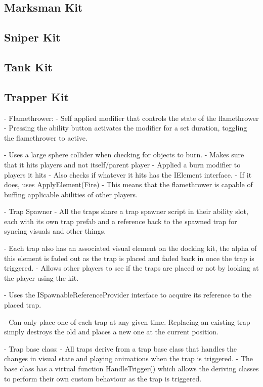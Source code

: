 \subsection{Marksman Kit}
\subsection{Sniper Kit}
\subsection{Tank Kit}

\subsection{Trapper Kit}
- Flamethrower:
    - Self applied modifier that controls the state of the flamethrower
    - Pressing the ability button activates the modifier for a set duration, toggling the flamethrower to active.
    
    - Uses a large sphere collider when checking for objects to burn.
            - Makes sure that it hits players and not itself/parent player
            - Applied a burn modifier to players it hits
            - Also checks if whatever it hits has the IElement interface.
                - If it does, uses ApplyElement(Fire)
            - This means that the flamethrower is capable of buffing applicable abilities of other players. 

- Trap Spawner
    - All the traps share a trap spawner script in their ability slot, each with its own trap prefab and a reference back to the spawned trap for syncing visuals and other things. 
    
    - Each trap also has an associated visual element on the docking kit, the alpha of this element is faded out as the trap is placed and faded back in once the trap is triggered. 
        - Allows other players to see if the traps are placed or not by looking at the player using the kit.
        
    - Uses the ISpawnableReferenceProvider interface to acquire its reference to the placed trap. 
    
    - Can only place one of each trap at any given time. Replacing an existing trap simply destroys the old and places a new one at the current position. 

- Trap base class:
    - All traps derive from a trap base class that handles the changes in visual state and playing animations when the trap is triggered. 
    - The base class has a virtual function HandleTrigger() which allows the deriving classes to perform their own custom behaviour as the trap is triggered. 
    
